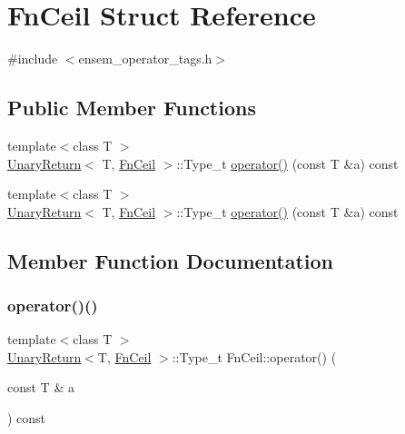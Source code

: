 \hypertarget{structFnCeil}{}\section{Fn\+Ceil Struct Reference}
\label{structFnCeil}


{\ttfamily \#include $<$ensem\+\_\+operator\+\_\+tags.\+h$>$}

\subsection*{Public Member Functions}
\begin{DoxyCompactItemize}
\item 
{\footnotesize template$<$class T $>$ }\\\mbox{\hyperlink{structUnaryReturn}{Unary\+Return}}$<$ T, \mbox{\hyperlink{structFnCeil}{Fn\+Ceil}} $>$\+::Type\+\_\+t \mbox{\hyperlink{structFnCeil_a9588c4122c2bacfe31df3cf25cb9d172}{operator()}} (const T \&a) const
\item 
{\footnotesize template$<$class T $>$ }\\\mbox{\hyperlink{structUnaryReturn}{Unary\+Return}}$<$ T, \mbox{\hyperlink{structFnCeil}{Fn\+Ceil}} $>$\+::Type\+\_\+t \mbox{\hyperlink{structFnCeil_a9588c4122c2bacfe31df3cf25cb9d172}{operator()}} (const T \&a) const
\end{DoxyCompactItemize}


\subsection{Member Function Documentation}
\mbox{\label{structFnCeil_a9588c4122c2bacfe31df3cf25cb9d172}} 
\subsubsection{\texorpdfstring{operator()()}{operator()()}\hspace{0.1cm}{\footnotesize\ttfamily [1/2]}}
{\footnotesize\ttfamily template$<$class T $>$ \\
\mbox{\hyperlink{structUnaryReturn}{Unary\+Return}}$<$T, \mbox{\hyperlink{structFnCeil}{Fn\+Ceil}} $>$\+::Type\+\_\+t Fn\+Ceil\+::operator() (\begin{DoxyParamCaption}\item[{const T \&}]{a }\end{DoxyParamCaption}) const\hspace{0.3cm}{\ttfamily [inline]}}

